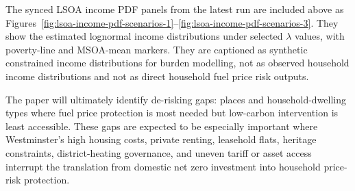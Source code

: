 The synced LSOA income PDF panels from the latest run are included above as Figures~\ref{fig:lsoa-income-pdf-scenarios-1}--\ref{fig:lsoa-income-pdf-scenarios-3}. They show the estimated lognormal income distributions under selected $\lambda$ values, with poverty-line and MSOA-mean markers. They are captioned as synthetic constrained income distributions for burden modelling, not as observed household income distributions and not as direct household fuel price risk outputs.

The paper will ultimately identify de-risking gaps: places and household-dwelling types where fuel price protection is most needed but low-carbon intervention is least accessible. These gaps are expected to be especially important where Westminster's high housing costs, private renting, leasehold flats, heritage constraints, district-heating governance, and uneven tariff or asset access interrupt the translation from domestic net zero investment into household price-risk protection.
